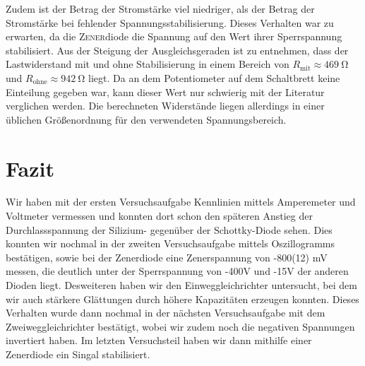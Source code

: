 \documentclass[a4paper,10pt]{article}
\numberwithin{equation}{section}
\begin{document}
Zudem ist der Betrag der Stromstärke viel niedriger, als der Betrag der Stromstärke bei fehlender Spannungsstabilisierung.
Dieses Verhalten war zu erwarten, da die \textsc{Zener}diode die Spannung auf den Wert ihrer Sperrspannung stabilisiert.
Aus der Steigung der Ausgleichsgeraden ist zu entnehmen, dass der Lastwiderstand mit und ohne Stabilisierung in einem Bereich von $R_\text{mit} \approx \SI{469}{\ohm}$ und $R_\text{ohne} \approx \SI{942}{\ohm}$ liegt.
Da an dem Potentiometer auf dem Schaltbrett keine Einteilung gegeben war, kann dieser Wert nur schwierig mit der Literatur verglichen werden.
Die berechneten Widerstände liegen allerdings in einer üblichen Größenordnung für den verwendeten Spannungsbereich.
\clearpage
\section{Fazit}
Wir haben mit der ersten Versuchsaufgabe Kennlinien mittels Amperemeter und Voltmeter vermessen und konnten dort schon den späteren Anstieg der Durchlassspannung der Silizium- gegenüber der Schottky-Diode sehen. Dies konnten wir nochmal in der zweiten Versuchsaufgabe mittels Oszillogramms bestätigen, sowie bei der Zenerdiode eine Zenerspannung von -800(12) mV messen, die deutlich unter der Sperrspannung von -400V und -15V der anderen Dioden liegt. Desweiteren haben wir den Einweggleichrichter untersucht, bei dem wir auch stärkere Glättungen durch höhere Kapazitäten erzeugen konnten. Dieses Verhalten wurde dann nochmal in der nächsten Versuchsaufgabe mit dem Zweiweggleichrichter bestätigt, wobei wir zudem noch die negativen Spannungen invertiert haben. Im letzten Versuchsteil haben wir dann mithilfe einer Zenerdiode ein Singal stabilisiert.
 
\clearpage
\listoffigures
\listoftables



\clearpage
\end{document}
